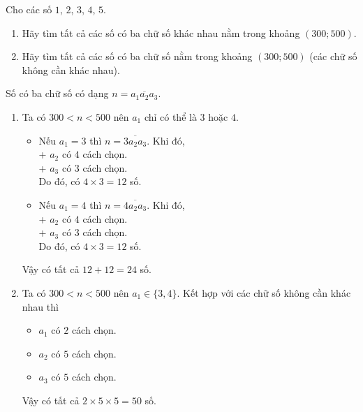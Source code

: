 \begin{bt}%
	Cho các  số $1$, $2$, $3$, $4$, $5$.
	\begin{enumerate}
		\item Hãy tìm tất cả các số có ba chữ số khác nhau nằm trong khoảng $(300; 500)$.
		\item Hãy tìm tất cả các số có ba chữ số  nằm trong khoảng $(300; 500)$ (các chữ số không cần khác nhau).
	\end{enumerate}
	\loigiai
	{Số có ba chữ số có dạng $n=\overline{a_1a_2a_3}$.
		\begin{enumerate}
			\item Ta có $300<n<500$ nên $a_1$ chỉ có thể là $3$ hoặc $4$.
			      \begin{itemize}
				      \item Nếu $a_1=3$ thì $n=\overline{3a_2a_3}$. Khi đó,\\
				            + $a_2$ có $4$ cách chọn.\\
				            + $a_3$ có $3$ cách chọn.\\
				            Do đó, có $4\times 3=12$ số.
				      \item Nếu $a_1=4$ thì $n=\overline{4a_2a_3}$. Khi đó,\\
				            + $a_2$ có $4$ cách chọn.\\
				            + $a_3$ có $3$ cách chọn.\\
				            Do đó, có $4\times 3=12$ số.
			      \end{itemize}
			      Vậy có tất cả $12+12=24$ số.
			\item Ta có $300<n<500$ nên $a_1\in\{3, 4\}$. Kết hợp với các chữ số không cần khác nhau thì
			      \begin{itemize}
				      \item $a_1$ có $2$ cách chọn.
				      \item $a_2$ có $5$ cách chọn.
				      \item $a_3$ có $5$ cách chọn.
			      \end{itemize}
			      Vậy có tất cả $2\times 5\times 5=50$ số.
		\end{enumerate}
	}
\end{bt}

